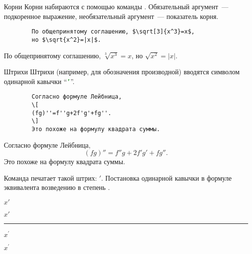 \begin{frame}[fragile]{Корни}
	\Large
	Корни набираются с помощью команды \texttt{\sqrt}. Обязательный аргумент~--- подкоренное выражение, необязательный аргумент~--- показатель корня.
	
	\begin{verbatim}
		По общепринятому соглашению, $\sqrt[3]{x^3}=x$, 
		но $\sqrt{x^2}=|x|$.
	\end{verbatim}

	По общепринятому соглашению, $\sqrt[3]{x^3}=x$, но $\sqrt{x^2}=|x|$.

\end{frame}

\begin{frame}[fragile]{Штрихи}
	Штрихи (например, для обозначения производной) вводятся символом одинарной кавычки ``\textcolor{Green}{\texttt{'}}''.
	
	\begin{minipage}{0.59\textwidth}
	\begin{verbatim}
		Согласно формуле Лейбница,
		\[
		(fg)''=f''g+2f'g'+fg''.
		\]
		Это похоже на формулу квадрата суммы.
	\end{verbatim}
	\end{minipage}
	\begin{minipage}{0.39\textwidth}
		Согласно формуле Лейбница,
		\[
		(fg)''=f''g+2f'g'+fg''.
		\]
		Это похоже на формулу квадрата суммы.
	\end{minipage}

	Команда \texttt{\prime} печатает такой  штрих: $\prime$. Постановка одинарной кавычки в формуле эквивалента возведению в степень \texttt{\prime}. 
	
	\begin{minipage}{0.49\textwidth}
		\texttt{$x'$}
	\end{minipage}
	\begin{minipage}{0.49\textwidth}
		\begin{center}
			$x'$
		\end{center}
	\end{minipage}
	\noindent\rule{\textwidth}{1pt}
	\begin{minipage}{0.49\textwidth}
		\texttt{$x^\prime$}
	\end{minipage}
	\begin{minipage}{0.49\textwidth}
		\begin{center}
			$x^\prime$
		\end{center}
	\end{minipage}
\end{frame}

